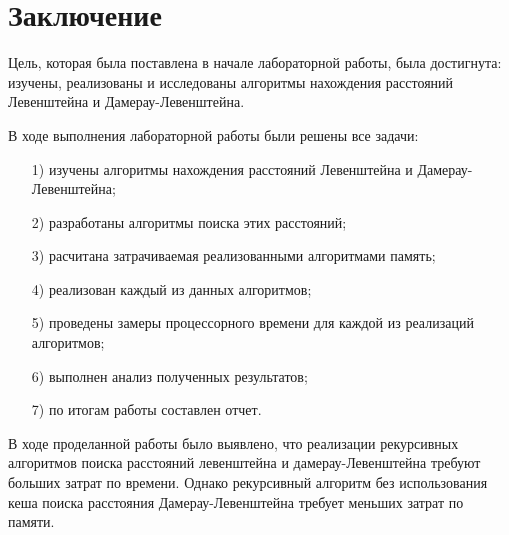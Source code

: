 \chapter*{Заключение}
Цель, которая была поставлена в начале лабораторной работы, была достигнута: изучены, реализованы и исследованы
алгоритмы нахождения расстояний Левенштейна и Дамерау-Левенштейна.

В ходе выполнения лабораторной работы были решены все задачи:
\begin{enumerate}
	\item[1)] изучены алгоритмы нахождения расстояний Левенштейна и Дамерау-Левенштейна;
	\item[2)] разработаны алгоритмы поиска этих расстояний;
	\item[3)] расчитана затрачиваемая реализованными алгоритмами память;
	\item[4)] реализован каждый из данных алгоритмов;
	\item[5)] проведены замеры процессорного времени для каждой из реализаций алгоритмов;
	\item[6)] выполнен анализ полученных результатов;
	\item[7)] по итогам работы составлен отчет.
\end{enumerate}

В ходе проделанной работы было выявлено, что реализации рекурсивных алгоритмов поиска расстояний левенштейна и дамерау-Левенштейна требуют больших затрат по времени. Однако рекурсивный алгоритм без использования кеша поиска расстояния Дамерау-Левенштейна требует меньших затрат по памяти. 